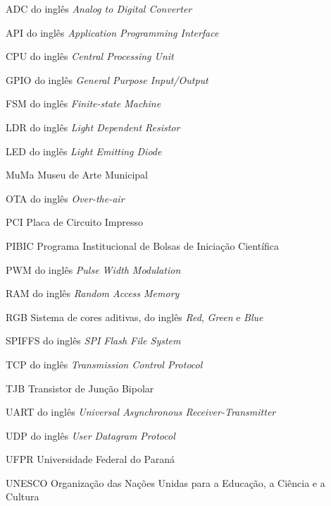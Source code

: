 \begin{siglas}
    \item[ADC] do inglês \emph{Analog to Digital Converter}
    \item[API] do inglês \emph{Application Programming Interface}
    \item[CPU] do inglês \emph{Central Processing Unit}
    \item[GPIO] do inglês \emph{General Purpose Input/Output}
    \item[FSM] do inglês \emph{Finite-state Machine}
    \item[LDR] do inglês \emph{Light Dependent Resistor}
    \item[LED] do inglês \emph{Light Emitting Diode}
    \item[MuMa] Museu de Arte Municipal
    \item[OTA] do inglês \emph{Over-the-air}
    \item[PCI] Placa de Circuito Impresso
    \item[PIBIC] Programa Institucional de Bolsas de Iniciação Científica
    \item[PWM] do inglês \emph{Pulse Width Modulation}
    \item[RAM] do inglês \emph{Random Access Memory}
    \item[RGB] Sistema de cores aditivas, do inglês \emph{Red}, \emph{Green} e \emph{Blue}
    \item[SPIFFS] do inglês \emph{SPI Flash File System}
    \item[TCP] do inglês \emph{Transmission Control Protocol}
    \item[TJB] Transistor de Junção Bipolar
    \item[UART] do inglês \emph{Universal Asynchronous Receiver-Transmitter}
    \item[UDP] do inglês \emph{User Datagram Protocol}
    \item[UFPR] Universidade Federal do Paraná
    \item[UNESCO] Organização das Nações Unidas para a Educação, a Ciência e a Cultura
\end{siglas}

